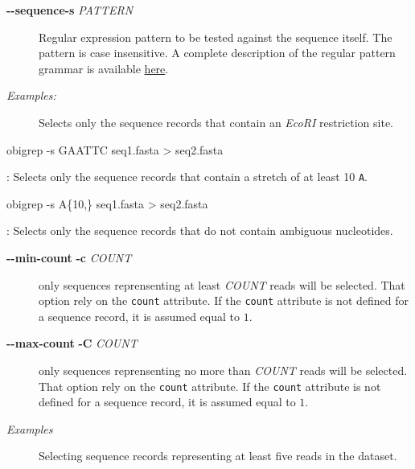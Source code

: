 \documentclass[
  letterpaper,
  DIV=11,
  numbers=noendperiod]{scrreprt}
\newenvironment{Shaded}{\begin{snugshade}}{\end{snugshade}}
\newcommand{\AttributeTok}[1]{\textcolor[rgb]{0.40,0.45,0.13}{#1}}
\newcommand{\ExtensionTok}[1]{\textcolor[rgb]{0.00,0.23,0.31}{#1}}
\newcommand{\NormalTok}[1]{\textcolor[rgb]{0.00,0.23,0.31}{#1}}
\newcommand{\OperatorTok}[1]{\textcolor[rgb]{0.37,0.37,0.37}{#1}}
\newcommand{\StringTok}[1]{\textcolor[rgb]{0.13,0.47,0.30}{#1}}
\begin{document}
\begin{description}
\item[\textbf{-\/-sequence}\textbar{}\textbf{-s} \emph{PATTERN}]
Regular expression pattern to be tested against the sequence itself. The
pattern is case insensitive. A complete description of the regular
pattern grammar is available
\href{https://yourbasic.org/golang/regexp-cheat-sheet/\#cheat-sheet}{here}.
\item[\emph{Examples:}]
Selects only the sequence records that contain an \emph{EcoRI}
restriction site.
\end{description}

\begin{Shaded}
\begin{Highlighting}[]
\ExtensionTok{obigrep} \AttributeTok{{-}s} \StringTok{\textquotesingle{}GAATTC\textquotesingle{}}\NormalTok{ seq1.fasta }\OperatorTok{\textgreater{}}\NormalTok{ seq2.fasta}
\end{Highlighting}
\end{Shaded}

: Selects only the sequence records that contain a stretch of at least
10 \texttt{A}.

\begin{Shaded}
\begin{Highlighting}[]
\ExtensionTok{obigrep} \AttributeTok{{-}s} \StringTok{\textquotesingle{}A\{10,\}\textquotesingle{}}\NormalTok{ seq1.fasta }\OperatorTok{\textgreater{}}\NormalTok{ seq2.fasta}
\end{Highlighting}
\end{Shaded}

: Selects only the sequence records that do not contain ambiguous
nucleotides.

\begin{Shaded}
\end{Shaded}

\begin{description}
\item[\textbf{-\/-min-count} \textbar{} \textbf{-c} \emph{COUNT}]
only sequences reprensenting at least \emph{COUNT} reads will be
selected. That option rely on the \texttt{count} attribute. If the
\texttt{count} attribute is not defined for a sequence record, it is
assumed equal to \(1\).
\item[\textbf{-\/-max-count} \textbar{} \textbf{-C} \emph{COUNT}]
only sequences reprensenting no more than \emph{COUNT} reads will be
selected. That option rely on the \texttt{count} attribute. If the
\texttt{count} attribute is not defined for a sequence record, it is
assumed equal to \(1\).
\item[\emph{Examples}]
Selecting sequence records representing at least five reads in the
dataset.
\end{description}
\end{document}
